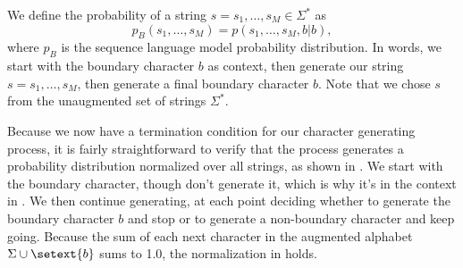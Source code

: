 We define the probability of a string $s = s_1,\ldots,s_M \in \Sigma^*$
as
%
\begin{equation}
p_B(s_1,\ldots,s_M) = p(s_1,\ldots,s_M,b|b),\label{equation:lm-seq-def}
\end{equation}
%
where $p_B$ is the sequence language model probability distribution.
In words, we start with the boundary character $b$ as context, then
generate our string $s = s_1,\ldots,s_M$, then generate a final
boundary character $b$.  Note that we chose $s$ from the unaugmented
set of strings  $\Sigma^*$.  

Because we now have a termination condition for our character
generating process, it is fairly straightforward to verify that the
process generates a probability distribution normalized over all
strings, as shown in .  We start with the boundary
character, though don't generate it, which is why it's in the context
in .  We then continue generating, at each point
deciding whether to generate the boundary character $b$ and stop or to
generate a non-boundary character and keep going.  Because the sum of
each next character in the augmented alphabet $\Sigma \cup \setext{b}$
sums to 1.0, the normalization in  holds.











